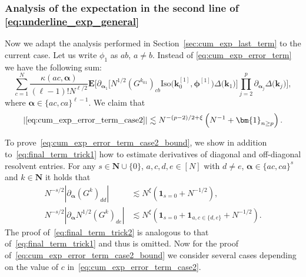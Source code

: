 \documentclass[10pt]{amsart}
\numberwithin{equation}{section}
\newcommand{\E}{\mathbf{E}}
\newcommand{\N}{\mathbf{N}}
\begin{document}
\subsubsection{Analysis of the expectation in the second line of \eqref{eq:underline_exp_general}}\label{sec:cum_exp_last_term2}

Now we adapt the analysis performed in Section~\ref{sec:cum_exp_last_term} to the current case. Let us write $\phi_1$ as $ab$, $a\neq b$. Instead of \eqref{eq:cum_exp_error_term} we have the following sum:
\begin{equation}
\sum_{c=1}^N\frac{\kappa(ac,\bm{\alpha})}{(\ell-1)!N^{\ell/2}}\E\bigg[\partial_{\bm{\alpha}_1}\Big[N^{1/2}\left(G^{k_{01}}\right)_{cb}\mathrm{Iso}\big(\bm{k}_0^{[1]},\bm{\phi}^{[1]}\big)\Delta\big(\bm{k}_1\big)\Big] \prod_{j=2}^p \partial_{\bm{\alpha}_j}\Delta\big(\bm{k}_j\big)\bigg],
\label{eq:cum_exp_error_term_case2}
\end{equation}
where $\bm{\alpha}\in\{ac,ca\}^{\ell-1}$. We claim that
\begin{equation}
\left\vert \eqref{eq:cum_exp_error_term_case2}\right\vert \lesssim  N^{-(p-2)/2+\xi}\left(N^{-1} + \bm{1}_{n\ge p}\right).
\label{eq:cum_exp_error_term_case2_bound}
\end{equation}

To prove~\eqref{eq:cum_exp_error_term_case2_bound}, we show in addition to~\eqref{eq:final_term_trick1} how to estimate derivatives of diagonal and off-diagonal resolvent entries. For any $s\in \N\cup\{0\}$,  $a,c,d,e\in[N]$ with $d\neq e$, $\bm{\alpha}\in\{ac,ca\}^s$ and $k\in\N$ it holds that
\begin{equation}
\begin{split}
N^{-s/2} \left\vert \partial_{\bm{\alpha}}(G^k)_{dd}\right\vert &\lesssim N^\xi\left( \bm{1}_{s=0}+N^{-1/2}\right),\\
N^{-s/2} \left\vert \partial_{\bm{\alpha}}N^{1/2}(G^k)_{de}\right\vert &\lesssim N^\xi\left( \bm{1}_{s=0}+\bm{1}_{a,c\in\{d,e\}}+N^{-1/2}\right).
\end{split}
\label{eq:final_term_trick2}
\end{equation} 
The proof of~\eqref{eq:final_term_trick2} is analogous to that of~\eqref{eq:final_term_trick1} and thus is omitted. Now 
for the proof of~\eqref{eq:cum_exp_error_term_case2_bound} we consider several cases depending on the value of $c$ in~\eqref{eq:cum_exp_error_term_case2}.

\smallskip
\end{document}

